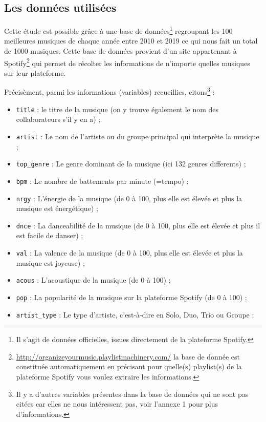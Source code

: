 \documentclass[french,]{compterendu}
\providecommand{\tightlist}{%
  \setlength{\itemsep}{0pt}\setlength{\parskip}{0pt}}
\let\rmarkdownfootnote\footnote%
\def\footnote{\protect\rmarkdownfootnote}
\theoremstyle{urcastyle}
\theoremstyle{remark}
\begin{document}
\hypertarget{les-donnuxe9es-utilisuxe9es}{%
\subsection{Les données utilisées}\label{les-donnuxe9es-utilisuxe9es}}

Cette étude est possible grâce à une base de données\footnote{Il s'agit de données officielles, issues directement de la plateforme Spotify.} regroupant les 100 meilleures musiques de chaque année entre 2010 et 2019 ce qui nous fait un total de 1000 musiques. Cette base de données provient d'un site appartenant à Spotify\footnote{\url{http://organizeyourmusic.playlistmachinery.com/} la base de donnée est constituée automatiquement en précisant pour quelle(s) playlist(s) de la plateforme Spotify vous voulez extraire les informations.} qui permet de récolter les informations de n'importe quelles musiques sur leur plateforme.

Précisèment, parmi les informations (variables) recueillies, citons\footnote{Il y a d'autres variables présentes dans la base de données qui ne sont pas citées car elles ne nous intéressent pas, voir l'annexe 1 pour plus d'informations.} :

\begin{itemize}
\tightlist
\item
  \texttt{title} : le titre de la musique (on y trouve également le nom des collaborateurs s'il y en a) ;
\item
  \texttt{artist} : Le nom de l'artiste ou du groupe principal qui interprète la musique ;
\item
  \texttt{top\_genre} : Le genre dominant de la musique (ici 132 genres differents) ;
\item
  \texttt{bpm} : Le nombre de battements par minute (=tempo) ;
\item
  \texttt{nrgy} : L'énergie de la musique (de 0 à 100, plus elle est élevée et plus la musique est énergétique) ;
\item
  \texttt{dnce} : La danceabilité de la musique (de 0 à 100, plus elle est élevée et plus il est facile de danser) ;
\item
  \texttt{val} : La valence de la musique (de 0 à 100, plus elle est élevée et plus la musique est joyeuse) ;
\item
  \texttt{acous} : L'acoustique de la musique (de 0 à 100) ;
\item
  \texttt{pop} : La popularité de la musique sur la plateforme Spotify (de 0 à 100) ;
\item
  \texttt{artist\_type} : Le type d'artiste, c'est-à-dire en Solo, Duo, Trio ou Groupe ;
\end{itemize}
\end{document}
